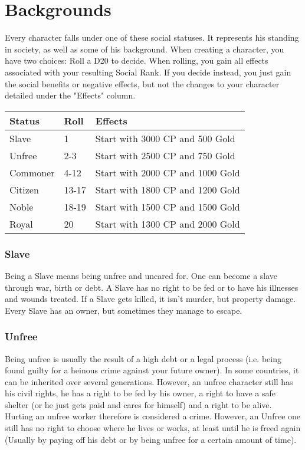 \chapter{Backgrounds}
Every character falls under one of these social statuses. It represents his standing in society, as well as some of his background. When creating a character, you have two choices: Roll a D20 to decide. When rolling, you gain all effects associated with your resulting Social Rank. If you decide instead, you just gain the social benefits or negative effects, but not the changes to your character detailed under the "Effects" column.\\

\begin{tabular}{l | l | p{7.5cm}}
	Status & Roll & Effects\\ \hline
	Slave & 1 & Start with 3000 CP and 500 Gold\\
	Unfree & 2-3 & Start with 2500 CP and 750 Gold\\
	Commoner & 4-12 & Start with 2000 CP and 1000 Gold\\
	Citizen & 13-17 & Start with 1800 CP and 1200 Gold\\
	Noble & 18-19 & Start with 1500 CP and 1500 Gold\\
	Royal & 20 & Start with 1300 CP and 2000 Gold
\end{tabular}

\subsection{Slave}

Being a Slave means being unfree and uncared for. One can become a slave through war, birth or debt. A Slave has no right to be fed or to have his illnesses and wounds treated. If a Slave gets killed, it isn’t murder, but property damage. Every Slave has an owner, but sometimes they manage to escape. 

\subsection{Unfree}

Being unfree is usually the result of a high debt or a legal process (i.e. being found guilty for a heinous crime against your future owner). In some countries, it can be inherited over several generations. However, an unfree character still has his civil rights, he has a right to be fed by his owner, a right to have a safe shelter (or he just gets paid and cares for himself) and a right to be alive. Hurting an unfree worker therefore is considered a crime. However, an Unfree one still has no right to choose where he lives or works, at least until he is freed again (Usually by paying off his debt or by being unfree for a certain amount of time).

